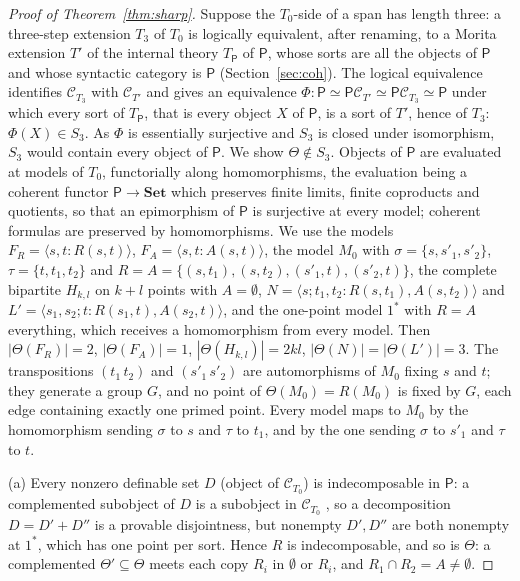 \documentclass[11pt]{amsart}
\theoremstyle{definition}
\newcommand{\Set}{\mathbf{Set}}
\newcommand{\PP}{\mathsf P}
\newcommand{\cC}{\mathcal C}
\begin{document}
\begin{proof}[Proof of Theorem~\ref{thm:sharp}]
Suppose the $T_0$-side of a span has length three: a three-step
extension $T_3$ of $T_0$ is logically equivalent, after renaming, to a
Morita extension $T'$ of the internal theory $T_\PP$ of $\PP$, whose
sorts are all the objects of $\PP$ and whose syntactic category is $\PP$
(Section~\ref{sec:coh}). The logical equivalence identifies $\cC_{T_3}$
with $\cC_{T'}$ and gives an equivalence
$\Phi\colon\PP\simeq\PP\cC_{T'}\simeq\PP\cC_{T_3}\simeq\PP$ under which
every sort of $T_\PP$, that is every object $X$ of $\PP$, is a sort of
$T'$, hence of $T_3$: $\Phi(X)\in S_3$. As $\Phi$ is essentially
surjective and $S_3$ is closed under isomorphism, $S_3$ would contain
every object of $\PP$. We show $\Theta\notin S_3$. Objects of $\PP$ are
evaluated at models of $T_0$, functorially along homomorphisms, the
evaluation being a coherent functor $\PP\to\Set$ which preserves finite
limits, finite coproducts and quotients, so that an epimorphism of
$\PP$ is surjective at every model; coherent formulas are preserved by
homomorphisms. We use the models $F_R=\langle s,t:R(s,t)\rangle$,
$F_A=\langle s,t:A(s,t)\rangle$, the model $M_0$ with
$\sigma=\{s,s'_1,s'_2\}$, $\tau=\{t,t_1,t_2\}$ and
$R=A=\{(s,t_1),(s,t_2),(s'_1,t),(s'_2,t)\}$, the complete bipartite $H_{k,l}$ on
$k+l$ points with $A=\emptyset$, $N=\langle s;t_1,t_2:R(s,t_1),A(s,t_2)\rangle$
and $L'=\langle s_1,s_2;t:R(s_1,t),A(s_2,t)\rangle$, and the one-point
model $1^*$ with $R=A$ everything, which receives a homomorphism from
every model. Then $|\Theta(F_R)|=2$, $|\Theta(F_A)|=1$,
$|\Theta(H_{k,l})|=2kl$, $|\Theta(N)|=|\Theta(L')|=3$. The transpositions
$(t_1\,t_2)$ and $(s'_1\,s'_2)$ are automorphisms of $M_0$ fixing $s$ and
$t$; they generate a group $G$, and no point of $\Theta(M_0)=R(M_0)$ is
fixed by $G$, each edge containing exactly one primed point. Every model
maps to $M_0$ by the homomorphism sending $\sigma$ to $s$ and $\tau$ to
$t_1$, and by the one sending $\sigma$ to $s'_1$ and $\tau$ to $t$.

(a) Every nonzero definable set $D$ (object of $\cC_{T_0}$) is
indecomposable in $\PP$: a complemented subobject of $D$ is a subobject in $\cC_{T_0}$
\cite{CV98}, so a decomposition $D=D'+D''$ is a provable disjointness,
but nonempty $D',D''$ are both nonempty at $1^*$, which has one point
per sort. Hence $R$ is indecomposable, and so is $\Theta$: a complemented
$\Theta'\subseteq\Theta$ meets each copy $R_i$ in $\emptyset$ or $R_i$,
and $R_1\cap R_2=A\ne\emptyset$.


\end{proof}
\end{document}
